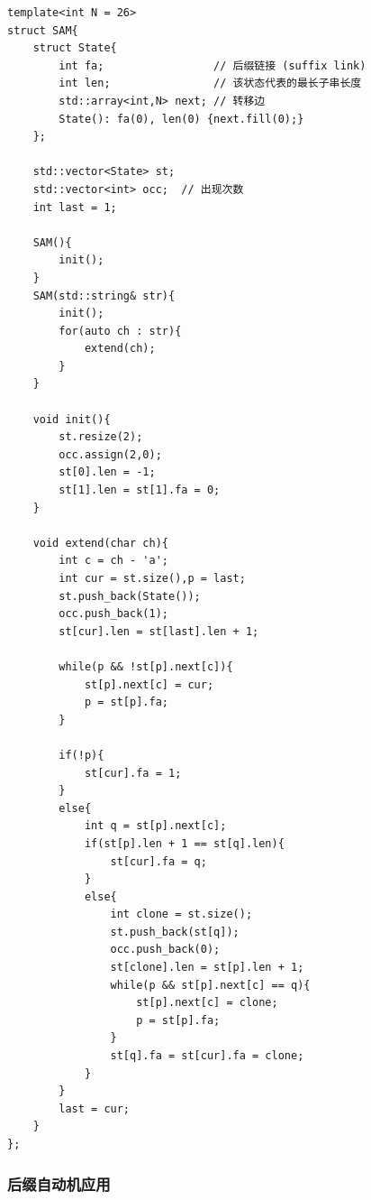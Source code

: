 \begin{lstlisting}[caption={}]
template<int N = 26>
struct SAM{
    struct State{
        int fa;                 // 后缀链接 (suffix link)
        int len;                // 该状态代表的最长子串长度
        std::array<int,N> next; // 转移边
        State(): fa(0), len(0) {next.fill(0);}
    };
    
    std::vector<State> st;
    std::vector<int> occ;  // 出现次数
    int last = 1;

    SAM(){
        init();
    }
    SAM(std::string& str){
        init();
        for(auto ch : str){
            extend(ch);
        }
    }

    void init(){
        st.resize(2);
        occ.assign(2,0);
        st[0].len = -1;
        st[1].len = st[1].fa = 0;
    }

    void extend(char ch){
        int c = ch - 'a';
        int cur = st.size(),p = last;
        st.push_back(State());
        occ.push_back(1);
        st[cur].len = st[last].len + 1;

        while(p && !st[p].next[c]){
            st[p].next[c] = cur;
            p = st[p].fa;
        }
        
        if(!p){
            st[cur].fa = 1;
        }
        else{
            int q = st[p].next[c];
            if(st[p].len + 1 == st[q].len){
                st[cur].fa = q;
            }
            else{
                int clone = st.size();
                st.push_back(st[q]);
                occ.push_back(0);
                st[clone].len = st[p].len + 1;
                while(p && st[p].next[c] == q){
                    st[p].next[c] = clone;
                    p = st[p].fa;
                }
                st[q].fa = st[cur].fa = clone;
            }
        }
        last = cur;
    }
};
\end{lstlisting}

\subsubsection{后缀自动机应用}

